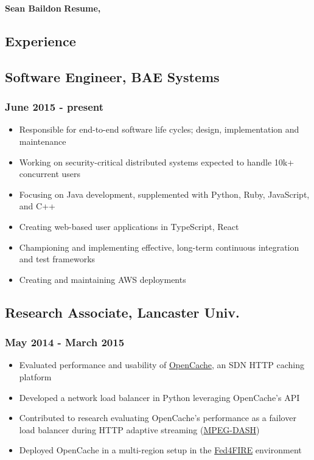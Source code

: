 \documentclass[a4paper,11pt]{article}
\begin{document}
\large
\noindent\textbf{Sean Baildon}
\hfill
\noindent\textbf{Resume, \the\year}
\normalsize

\vspace{2ex}
\hrulefill{}
\vspace{1ex}

\begin{multicols*}{2}

\section*{Experience}
\subsection*{Software Engineer, BAE Systems}
\subsubsection*{June 2015 - present}
\begin{itemize}[leftmargin=*]
	\item Responsible for end-to-end software life cycles; design, implementation and maintenance
	\item Working on security-critical distributed systems expected to handle 10k+ concurrent users
	\item Focusing on Java development, supplemented with Python, Ruby, JavaScript, and C++
	\item Creating web-based user applications in TypeScript, React
	\item Championing and implementing effective, long-term continuous integration and test frameworks
	\item Creating and maintaining AWS deployments
\end{itemize}

\subsection*{Research Associate, Lancaster Univ.}
\subsubsection*{May 2014 - March 2015}
\begin{itemize}[leftmargin=*]
	\item Evaluated performance and usability of \href{https://github.com/broadbent/opencache}{OpenCache}, an SDN HTTP caching platform
	\item Developed a network load balancer in Python leveraging OpenCache's API
	\item Contributed to research evaluating OpenCache's performance as a failover load balancer during HTTP adaptive streaming (\href{https://en.wikipedia.org/wiki/Dynamic_Adaptive_Streaming_over_HTTP}{MPEG-DASH})
	\item Deployed OpenCache in a multi-region setup in the \href{https://www.fed4fire.eu}{Fed4FIRE} environment
\end{itemize}


\end{multicols*}
\end{document}
